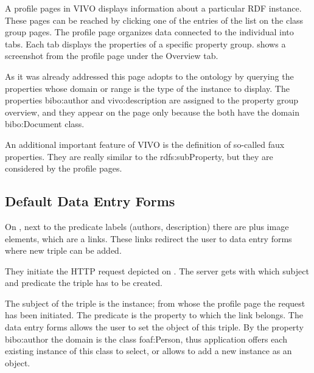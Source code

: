 A profile pages in VIVO displays information about a particular RDF instance. These pages can be reached by clicking one of the entries of the list on the class group pages. The profile page organizes data connected to the individual into tabs. Each tab displays the properties of a specific property group.  shows a screenshot from the profile page under the Overview tab.


As it was already addressed this page adopts to the ontology by querying the properties whose domain or range is the type of the instance to display.  The properties bibo:author and vivo:description are assigned to the property group overview, and they appear on the page only because the both have the domain bibo:Document class.


An additional important feature of VIVO is the definition of so-called faux properties. They are really similar to the rdfs:subProperty, but they are considered by the profile pages.

\subsection{Default Data Entry Forms}

On , next to the predicate labels (authors, description) there are plus image elements, which are a links. These links redirect the user to data entry forms where new triple can be added. 


They initiate the HTTP request depicted on . The server gets with which subject and predicate the triple has to be created.

The subject of the triple is the instance; from whose the profile page the request has been initiated. The predicate is the property to which the link belongs. The data entry forms allows the user to set the object of this triple. By the property bibo:author the domain is the class foaf:Person, thus application offers each existing instance of this class to select, or allows to add a new instance as an object. 


